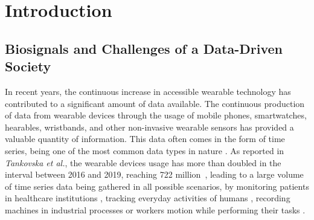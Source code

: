
%

\chapter{Introduction}
\label{cha:introduction}



\section{Biosignals and Challenges of a Data-Driven Society} 
\label{sub:motivation1}

In recent years, the continuous increase in accessible wearable technology has contributed to a significant amount of data available. The continuous production of data from wearable devices through the usage of mobile phones, smartwatches, hearables, wristbands, and other non-invasive wearable sensors has provided a valuable quantity of information. This data often comes in the form of time series, being one of the most common data types in nature \cite{puttinghuman}. As reported in \textit{Tankovska et al.}, the wearable devices usage has more than doubled in the interval between 2016 and 2019, reaching 722 million~\cite{tankovska_23_2020}, leading to a large volume of time series data being gathered in all possible scenarios, by monitoring patients in healthcare institutions \cite{cpd_medical_1, cpd_medical_2, cpd_medical_3, cpd_medical_4, dataset6, dataset7}, tracking everyday activities of humans \cite{cpd_har_1, cpd_har_2, review_1}, recording machines in industrial processes or workers motion while performing their tasks \cite{antonio, sara}. 

